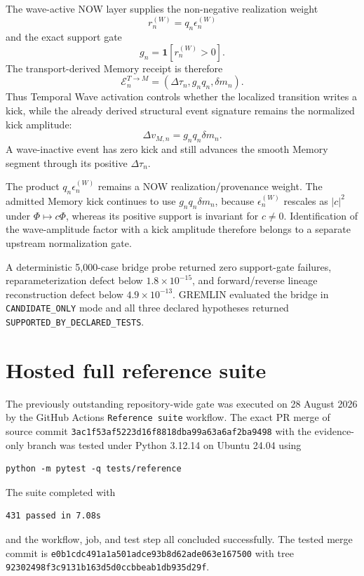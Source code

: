 The wave-active NOW layer supplies the non-negative realization weight
\[
r_n^{(W)}=q_n\epsilon_n^{(W)}
\]
and the exact support gate
\[
g_n=\mathbf 1[r_n^{(W)}>0].
\]
The transport-derived Memory receipt is therefore
\[
\boxed{
\mathcal E_n^{T\to M}
=(\Delta\tau_n,g_nq_n,\delta m_n).
}
\]
Thus Temporal Wave activation controls whether the localized transition writes a kick, while the already derived structural event signature remains the normalized kick amplitude:
\[
\boxed{
\Delta v_{M,n}=g_nq_n\delta m_n.
}
\]
A wave-inactive event has zero kick and still advances the smooth Memory segment through its positive \(\Delta\tau_n\).

The product \(q_n\epsilon_n^{(W)}\) remains a NOW realization/provenance weight. The admitted Memory kick continues to use \(g_nq_n\delta m_n\), because \(\epsilon_n^{(W)}\) rescales as \(|c|^2\) under \(\Phi\mapsto c\Phi\), whereas its positive support is invariant for \(c\neq0\). Identification of the wave-amplitude factor with a kick amplitude therefore belongs to a separate upstream normalization gate.

A deterministic 5,000-case bridge probe returned zero support-gate failures, reparameterization defect below \(1.8\times10^{-15}\), and forward/reverse lineage reconstruction defect below \(4.9\times10^{-13}\). GREMLIN evaluated the bridge in \texttt{CANDIDATE\_ONLY} mode and all three declared hypotheses returned \texttt{SUPPORTED\_BY\_DECLARED\_TESTS}.

\section{Hosted full reference suite}

The previously outstanding repository-wide gate was executed on 28 August 2026 by the GitHub Actions \texttt{Reference suite} workflow. The exact PR merge of source commit
\texttt{3ac1f53af5223d16f8818dba99a63a6af2ba9498}
with the evidence-only branch was tested under Python 3.12.14 on Ubuntu 24.04 using
\begin{verbatim}
python -m pytest -q tests/reference
\end{verbatim}
The suite completed with
\begin{verbatim}
431 passed in 7.08s
\end{verbatim}
and the workflow, job, and test step all concluded successfully. The tested merge commit is
\texttt{e0b1cdc491a1a501adce93b8d62ade063e167500}
with tree
\texttt{92302498f3c9131b163d5d0ccbbeab1db935d29f}.

